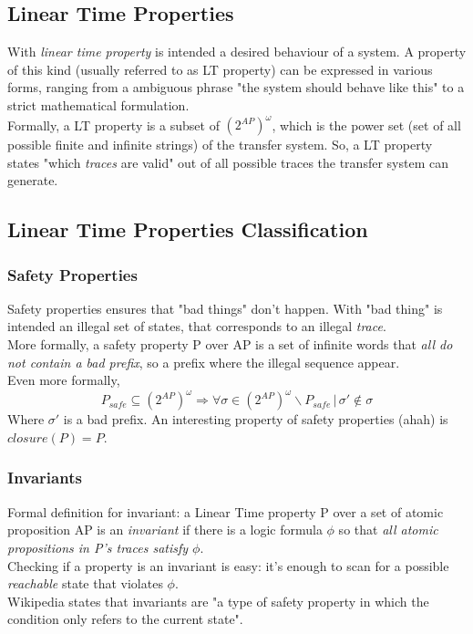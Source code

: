 \documentclass{article}
\begin{document}
			\subsection{Linear Time Properties}
				With \emph{linear time property} is intended a desired behaviour of a system. A property of this kind (usually referred to as LT property) can be expressed in various forms, ranging from a ambiguous phrase "the system should behave like this" to a strict mathematical formulation.\\
				Formally, a LT property is a subset of $(2^{AP})^{\omega}$, which is the power set (set of all possible finite and infinite strings) of the transfer system. So, a LT property states "which \emph{traces} are valid" out of all possible traces the transfer system can generate.
				
			\subsection{Linear Time Properties Classification}
				\subsubsection{Safety Properties}
					Safety properties ensures that "bad things" don't happen. With "bad thing" is intended an illegal set of states, that corresponds to an illegal \emph{trace}.\\
					More formally, a safety property P over AP is a set of infinite words that \emph{all do not contain a bad prefix}, so a prefix where the illegal sequence appear.\\
					Even more formally,
					\begin{equation}
						P_{safe} \subseteq (2^{AP})^{\omega} \Rightarrow \forall \sigma \in (2^{AP})^{\omega} \backslash P_{safe} \,\vert\, \sigma' \notin \sigma
					\end{equation}
					Where $\sigma'$ is a bad prefix. An interesting property of safety properties (ahah) is $closure(P) = P$.
					
				\subsubsection{Invariants}
					Formal definition for invariant: a Linear Time property P over a set of atomic proposition AP is an \emph{invariant} if there is a logic formula $\phi$ so that \emph{all atomic propositions in P's traces satisfy $\phi$}.\\
					Checking if a property is an invariant is easy: it's enough to scan for a possible \emph{reachable} state that violates $\phi$.\\
					Wikipedia states that invariants are "a type of safety property in which the condition only refers to the current state".
					
\end{document}
